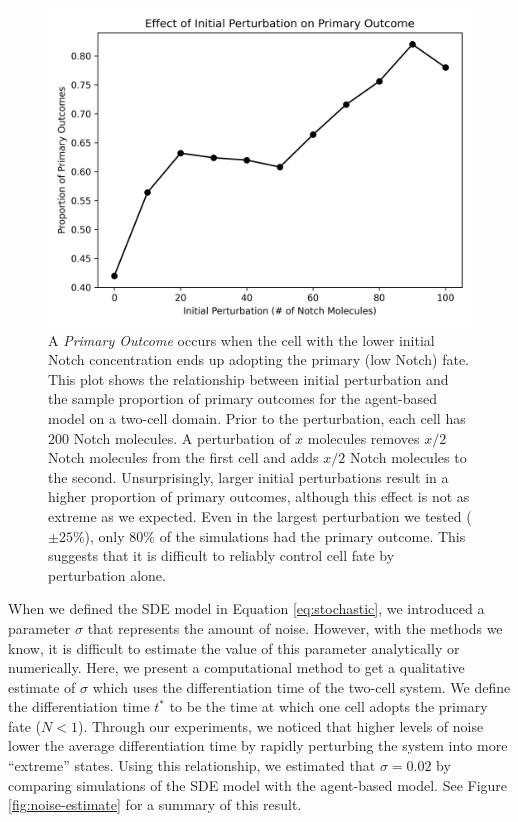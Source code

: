 \documentclass{article}
\begin{document}
\begin{flushleft}
\begin{figure}[!htp]
  \includegraphics[width=\textwidth]{img/vis12.png}
  \caption{A \emph{Primary Outcome} occurs when the cell with the lower initial Notch concentration ends up adopting the primary (low Notch) fate. This plot shows the relationship between initial perturbation and the sample proportion of primary outcomes for the agent-based model on a two-cell domain. Prior to the perturbation, each cell has $200$ Notch molecules. A perturbation of $x$ molecules removes $x/2$ Notch molecules from the first cell and adds $x/2$ Notch molecules to the second. Unsurprisingly, larger initial perturbations result in a higher proportion of primary outcomes, although this effect is not as extreme as we expected. Even in the largest perturbation we tested ($\pm 25\%$), only $80\%$ of the simulations had the primary outcome. This suggests that it is difficult to reliably control cell fate by perturbation alone.}
  \label{fig:outcome-forcing}
\end{figure}

\medskip

When we defined the SDE model in Equation \ref{eq:stochastic}, we introduced a parameter $\sigma$ that represents the amount of noise.
However, with the methods we know, it is difficult to estimate the value of this parameter analytically or numerically.
Here, we present a computational method to get a qualitative estimate of $\sigma$ which uses the differentiation time of the two-cell system.
We define the differentiation time $t^{*}$ to be the time at which one cell adopts the primary fate ($N < 1$).
Through our experiments, we noticed that higher levels of noise lower the average differentiation time by rapidly perturbing the system into more ``extreme'' states.
Using this relationship, we estimated that $\sigma = 0.02$ by comparing simulations of the SDE model with the agent-based model.
See Figure \ref{fig:noise-estimate} for a summary of this result.


\end{flushleft}
\end{document}
